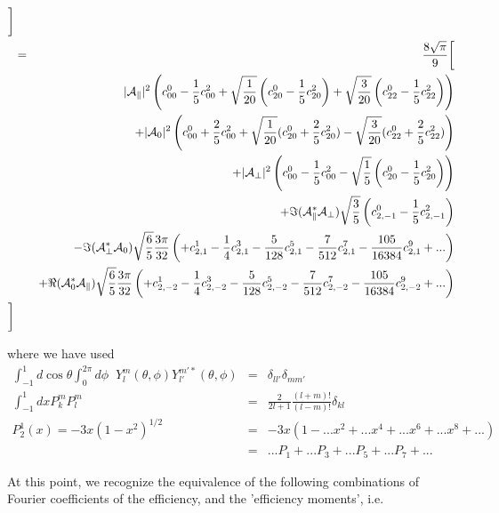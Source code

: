 \documentclass[a4paper,9pt,twoside]{article}
\begin{document}
\begin{eqnarray}
      \biggr] \\
      &=& \frac{8\sqrt{\pi}}{9}  \biggl[ \\
         &&                    |{\cal A}_\parallel|^2 \left( c^0_{00}-\frac{1}{5}c^2_{00}+\sqrt{\frac{1}{20}}\left(c^0_{20}-\frac{1}{5}c^2_{20}\right)+\sqrt{\frac{3}{20}}\left(c^0_{22}-\frac{1}{5}c^2_{22}\right)  \right)  \\
         &&                   +|{\cal A}_0|^2   \left( c^0_{00}+\frac{2}{5}c^2_{00}+\sqrt{\frac{1}{20}}(c^0_{20}+\frac{2}{5}c^2_{20})-\sqrt{\frac{3}{20}}(c^0_{22}+\frac{2}{5}c^2_{22}) \right) \\
         &&                   +|{\cal A}_\perp|^2    \left( c^0_{00}-\frac{1}{5}c^2_{00} - \sqrt{\frac{1}{5}}\left(c^0_{20}-\frac{1}{5}c^2_{20}\right)\right)\\
         &&                   +\Im({\cal A}_\parallel^*{\cal A}_\perp)\sqrt{\frac{3}{5}}\left(c^0_{2,-1}-\frac{1}{5}c^2_{2,-1}\right)  \\
         &&                   -\Im({\cal A}_\perp^* {\cal A}_0 )  \sqrt{\frac{6}{5}}\frac{3\pi}{32}\left( +c^1_{2,1} -\frac{1}{4}c^3_{2,1}- \frac{5}{128}c^5_{2,1} -\frac{7}{512}c^7_{2,1} - \frac{105}{16384}c^9_{2,1}+... \right) \\
         &&                   +\Re({\cal A}_0^*{\cal A}_\parallel)\sqrt{\frac{6}{5}}\frac{3\pi}{32}\left( +c^1_{2,-2}-\frac{1}{4}c^3_{2,-2}-\frac{5}{128}c^5_{2,-2}-\frac{7}{512}c^7_{2,-2} - \frac{105}{16384}c^9_{2,-2}+... \right) \\
      \biggr]
\end{eqnarray}

where we have used 
\begin{eqnarray}
\int_{-1}^1 d\cos\theta \int_0^{2\pi} d\phi \;\;Y_l^m(\theta,\phi) Y_{l'}^{m'*}(\theta,\phi) &=& \delta_{ll'}\delta_{mm'}\\
\int_{-1}^1 dx  P_k^m P_l^m&=& \frac{2}{2l+1}\frac{(l+m)!}{(l-m)!}\delta_{kl} \\
P_2^1(x) = -3x(1-x^2)^{1/2} &=& -3x(1-...  x^2 + ... x^4  + ...x^6 + ...x^8  + ... ) \\
&=& ...P_1 + ...P_3 + ...P_5 +...P_7 + ...
\end{eqnarray}

At this point, we recognize the equivalence of the following combinations of Fourier coefficients of the efficiency, and the 'efficiency moments',
i.e.
\end{document}

